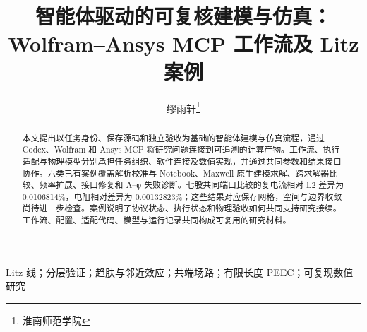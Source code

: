 \documentclass[journal,10pt]{IEEEtran}
\title{智能体驱动的可复核建模与仿真：Wolfram–Ansys MCP 工作流及 Litz 案例}
\author{缪雨轩\thanks{淮南师范学院}}
\date{}
\begin{document}
\maketitle
\begin{abstract}
本文提出以任务身份、保存源码和独立验收为基础的智能体建模与仿真流程，通过 Codex、Wolfram 和 Ansys MCP 将研究问题连接到可追溯的计算产物。工作流、执行适配与物理模型分别承担任务组织、软件连接及数值实现，并通过共同参数和结果接口协作。六类已有案例覆盖解析校准与 Notebook、Maxwell 原生建模求解、跨求解器比较、频率扩展、接口修复和 A–φ 失败诊断。七股共同端口比较的复电流相对 L2 差异为 0.0106814\%，电阻相对差异为 0.00132823\%；这些结果对应保存网格，空间与边界收敛尚待进一步检查。案例说明了协议状态、执行状态和物理验收如何共同支持研究接续。工作流、配置、适配代码、模型与运行记录共同构成可复用的研究材料。
\end{abstract}
\begin{IEEEkeywords}
Litz 线；分层验证；趋肤与邻近效应；共端场路；有限长度 PEEC；可复现数值研究
\end{IEEEkeywords}








\renewcommand{\refname}{参考文献}

\end{document}
